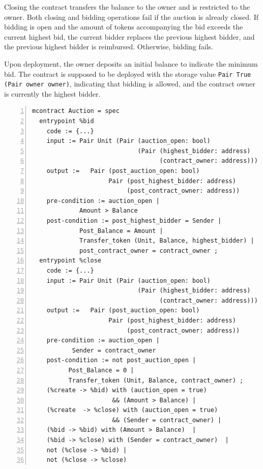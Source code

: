 \documentclass[a4paper,UKenglish,cleveref, autoref, thm-restate]{lipics-v2021}
\begin{document}
Closing the contract transfers the balance to the owner and is restricted to the owner. Both closing and bidding operations fail if the auction is already closed. If bidding is open and the amount of tokens accompanying the bid exceeds the current highest bid, the current bidder replaces the previous highest bidder, and the previous highest bidder is reimbursed. Otherwise, bidding fails.

Upon deployment, the owner deposits an initial balance to indicate the minimum bid. The contract is supposed to be deployed with the storage value  \lstinline/Pair True (Pair owner owner)/, indicating that bidding is allowed, and the contract owner is currently the highest bidder.

\begin{lstlisting}[float,captionpos=b,caption={Auction contract specification},label={lst:auction-contract-specification},numbers=left]
mcontract Auction = spec 
  entrypoint %bid
    code := {...}
    input := Pair Unit (Pair (auction_open: bool) 
                             (Pair (highest_bidder: address)
                                   (contract_owner: address)))
    output :=   Pair (post_auction_open: bool) 
                     Pair (post_highest_bidder: address)
                          (post_contract_owner: address))
    pre-condition := auction_open |
             Amount > Balance
    post-condition := post_highest_bidder = Sender |
             Post_Balance = Amount |
             Transfer_token (Unit, Balance, highest_bidder) |
             post_contract_owner = contract_owner ;
  entrypoint %close
    code := {...}
    input := Pair Unit (Pair (auction_open: bool) 
                             (Pair (highest_bidder: address)
                                   (contract_owner: address)))
    output :=   Pair (post_auction_open: bool) 
                     Pair (post_highest_bidder: address)
                          (post_contract_owner: address))
    pre-condition := auction_open |
           Sender = contract_owner                
    post-condition := not post_auction_open |
          Post_Balance = 0 |
          Transfer_token (Unit, Balance, contract_owner) ;
    (%create -> %bid) with (auction_open = true)  
                      && (Amount > Balance) | 
    (%create  -> %close) with (auction_open = true) 
                      && (Sender = contract_owner) |
    (%bid -> %bid) with (Amount > Balance)  | 
    (%bid -> %close) with (Sender = contract_owner)  | 
    not (%close -> %bid) |
    not (%close -> %close)
\end{lstlisting}
\end{document}
